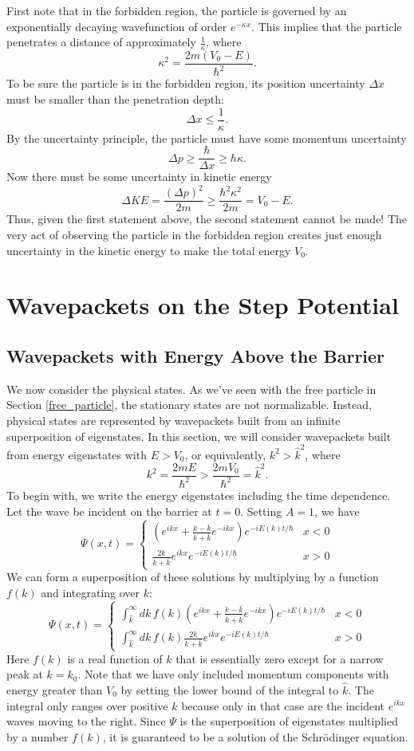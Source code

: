 First note that in the forbidden region, the particle is governed by an exponentially decaying wavefunction of order $e^{-\kappa x}$. This implies that the particle penetrates a distance of approximately $\frac{1}{\kappa}$, where $$\kappa^2=\frac{2m(V_0-E)}{\hbar^2}.$$To be sure the particle is in the forbidden region, its position uncertainty $\Delta x$ must be smaller than the penetration depth: $$\Delta x\leq \frac{1}{\kappa}.$$By the uncertainty principle, the particle must have some momentum uncertainty $$\Delta p\geq \frac{\hbar}{\Delta x}\geq\hbar\kappa.$$Now there must be some uncertainty in kinetic energy $$\Delta KE=\frac{(\Delta p)^2}{2m}\geq \frac{\hbar^2\kappa^2}{2m}=V_0-E.$$Thus, given the first statement above, the second statement cannot be made! The very act of observing the particle in the forbidden region creates just enough uncertainty in the kinetic energy to make the total energy $V_0$. 

\section{Wavepackets on the Step Potential}

\subsection{Wavepackets with Energy Above the Barrier}\label{wavepackets_energy_above_barrier}

We now consider the physical states. As we've seen with the free particle in Section \ref{free_particle}, the stationary states are not normalizable. Instead, physical states are represented by wavepackets built from an infinite superposition of eigenstates. In this section, we will consider wavepackets built from energy eigenstates with $E>V_0$, or equivalently, $k^2>\hat{k}^2$, where $$k^2=\frac{2mE}{\hbar^2}>\frac{2mV_0}{\hbar^2}=\hat{k}^2.$$To begin with, we write the energy eigenstates including the time dependence. Let the wave be incident on the barrier at $t=0$. Setting $A=1$, we have $$\Psi(x,t)=\begin{cases}(e^{ikx}+\frac{k-\bar{k}}{k+\bar{k}}e^{-ikx})e^{-iE(k)t/\hbar} & x<0 \\ \frac{2k}{k+\bar{k}}e^{i\bar{k}x}e^{-iE(k)t/\hbar} & x>0\end{cases}$$We can form a superposition of these solutions by multiplying by a function $f(k)$ and integrating over $k$: 
$$\Psi(x,t)=\begin{cases}\int_{\hat{k}}^\infty dk\,f(k)(e^{ikx}+\frac{k-\bar{k}}{k+\bar{k}}e^{-ikx})e^{-iE(k)t/\hbar} & x<0 \\ \int_{\hat{k}}^\infty dk\,f(k)\frac{2k}{k+\bar{k}}e^{i\bar{k}x}e^{-iE(k)t/\hbar} & x>0\end{cases}$$
Here $f(k)$ is a real function of $k$ that is essentially zero except for a narrow peak at $k=k_0$. Note that we have only included momentum components with energy greater than $V_0$ by setting the lower bound of the integral to $\hat{k}$. The integral only ranges over positive $k$ because only in that case are the incident $e^{ikx}$ waves moving to the right. Since $\Psi$ is the superposition of eigenstates multiplied by a number $f(k)$, it is guaranteed to be a solution of the Schrödinger equation.

